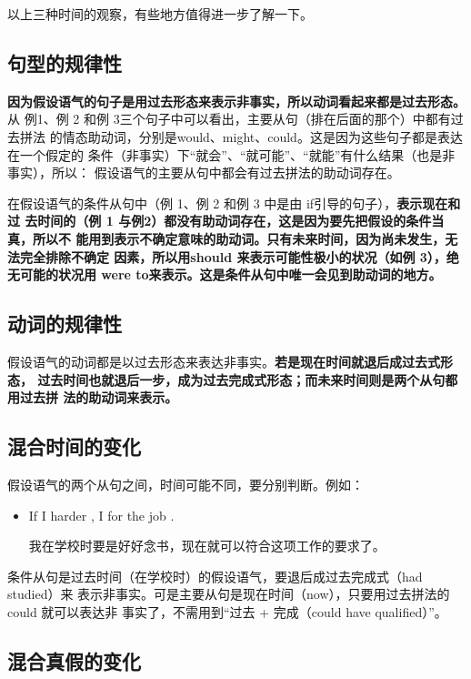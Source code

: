 以上三种时间的观察，有些地方值得进一步了解一下。

\subsection{句型的规律性}

\textbf{因为假设语气的句子是用过去形态来表示非事实，所以动词看起来都是过去形态。}从
例1、例 2 和例 3三个句子中可以看出，主要从句（排在后面的那个）中都有过去拼法
的情态助动词，分别是would、might、could。这是因为这些句子都是表达在一个假定的
条件（非事实）下“就会”、“就可能”、“就能”有什么结果（也是非事实），所以：
假设语气的主要从句中都会有过去拼法的助动词存在。

在假设语气的条件从句中（例 1、例 2 和例 3 中是由 if引导的句子），\textbf{表示现在和过
  去时间的（例 1 与例2）都没有助动词存在，这是因为要先把假设的条件当真，所以不
  能用到表示不确定意味的助动词。只有未来时间，因为尚未发生，无法完全排除不确定
  因素，所以用should 来表示可能性极小的状况（如例 3），绝无可能的状况用 were
  to来表示。这是条件从句中唯一会见到助动词的地方。}

\subsection{动词的规律性}

假设语气的动词都是以过去形态来表达非事实。\textbf{若是现在时间就退后成过去式形态，
  过去时间也就退后一步，成为过去完成式形态；而未来时间则是两个从句都用过去拼
  法的助动词来表示。}

\subsection{混合时间的变化}

假设语气的两个从句之间，时间可能不同，要分别判断。例如：
\begin{itemize}
\item If I  harder , I  for the job
  .

  我在学校时要是好好念书，现在就可以符合这项工作的要求了。
\end{itemize}
条件从句是过去时间（在学校时）的假设语气，要退后成过去完成式（had studied）来
表示非事实。可是主要从句是现在时间（now），只要用过去拼法的could 就可以表达非
事实了，不需用到“过去 + 完成（could have qualified）”。

\subsection{混合真假的变化}

